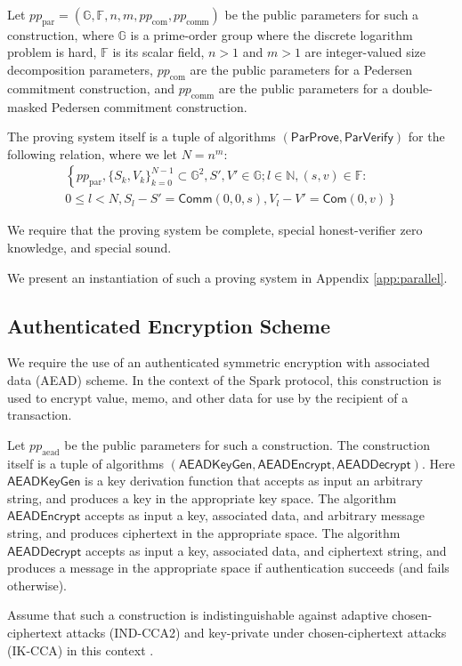 \documentclass{llncs}
\newcommand{\G}{\mathbb{G}}
\newcommand{\F}{\mathbb{F}}
\newcommand{\func}[1]{\mathsf{#1}}
\newcommand{\com}{\func{Com}}
\newcommand{\comm}{\func{Comm}}
\begin{document}
Let $pp_{\text{par}} = (\G, \F, n, m, pp_{\text{com}}, pp_{\text{comm}})$ be the public parameters for such a construction, where $\G$ is a prime-order group where the discrete logarithm problem is hard, $\F$ is its scalar field, $n > 1$ and $m > 1$ are integer-valued size decomposition parameters, $pp_{\text{com}}$ are the public parameters for a Pedersen commitment construction, and $pp_{\text{comm}}$ are the public parameters for a double-masked Pedersen commitment construction.

The proving system itself is a tuple of algorithms $(\func{ParProve},\func{ParVerify})$ for the following relation, where we let $N = n^m$:
\begin{multline*}
\left\{ pp_{\text{par}}, \{S_k,V_k\}_{k=0}^{N-1} \subset \G^2, S',V' \in \G ; l \in \mathbb{N}, (s,v) \in \F : \right. \\
\left. 0 \leq l < N, S_l - S' = \comm(0,0,s), V_l - V' = \com(0,v) \right\}
\end{multline*}

We require that the proving system be complete, special honest-verifier zero knowledge, and special sound.

We present an instantiation of such a proving system in Appendix \ref{app:parallel}.


\subsection{Authenticated Encryption Scheme}

We require the use of an authenticated symmetric encryption with associated data (AEAD) scheme.
In the context of the Spark protocol, this construction is used to encrypt value, memo, and other data for use by the recipient of a transaction.

Let $pp_{\text{aead}}$ be the public parameters for such a construction.
The construction itself is a tuple of algorithms $(\func{AEADKeyGen},\func{AEADEncrypt},\func{AEADDecrypt})$.
Here $\func{AEADKeyGen}$ is a key derivation function that accepts as input an arbitrary string, and produces a key in the appropriate key space.
The algorithm $\func{AEADEncrypt}$ accepts as input a key, associated data, and arbitrary message string, and produces ciphertext in the appropriate space.
The algorithm $\func{AEADDecrypt}$ accepts as input a key, associated data, and ciphertext string, and produces a message in the appropriate space if authentication succeeds (and fails otherwise).

Assume that such a construction is indistinguishable against adaptive chosen-ciphertext attacks (IND-CCA2) and key-private under chosen-ciphertext attacks (IK-CCA) in this context \cite{keyprivacy}.
\end{document}
